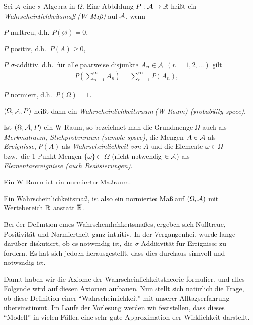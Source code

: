 \begin{defn}
\label{defn:1.7}
Sei $\AA$ eine $\sigma$-Algebra in $\Omega $.  Eine
Abbildung $P: \AA \to \R$ heißt ein \emph{Wahrscheinlichkeitsmaß
(W-Maß)} auf $\AA$, wenn
\begin{defnpropenum}
\item $P$ nulltreu, d.h. $P(\varnothing) = 0$,
\item $P$ positiv, d.h.\ $P(A) \geq 0$,
\item $P$ $\sigma$-additiv, d.h.\ für alle paarweise disjunkte $A_{n} \in
  \AA$\; $(n=1,2, \ldots )$ gilt
\begin{align*}
P\left(\sum^{\infty}_{n=1} A_{n}\right) = \sum^{\infty}_{n=1} P(A_{n}),
\end{align*}
\item $P$ normiert, d.h.\ $P(\Omega)= 1$.
\end{defnpropenum}
$(\Omega, \AA,P)$ heißt dann ein \emph{Wahrscheinlichkeitsraum (W-Raum)
(probability space)}.

Ist $(\Omega, \AA,P)$ ein W-Raum, so bezeichnet man die Grundmenge
$\Omega$ auch als \emph{Merkmalraum, Stichprobenraum (sample space)}, die Mengen
$A\in \AA$ als \emph{Ereignisse}, $P(A)$ als \emph{Wahrscheinlichkeit von $A$}
und die Elemente $\omega \in \Omega$ bzw.\ die 1-Punkt-Mengen $\{\omega \}
\subset \Omega $ (nicht notwendig $\in \AA$) als \emph{Elementarereignisse (auch
Realisierungen)}.

Ein W-Raum ist ein normierter Maßraum.\fishhere
\end{defn}

Ein Wahrscheinlichkeitsmaß, ist also ein normiertes Maß auf $(\Omega,\AA)$ mit
Wertebereich $\R$ anstatt $\RA$.

Bei der Definition eines Wahrscheinlichkeitsmaßes, ergeben sich Nulltreue,
Positivität und Normiertheit ganz intuitiv. In der Vergangenheit wurde lange
darüber diskutiert, ob es notwendig ist, die $\sigma$-Additivität für Ereignisse zu fordern. Es
hat sich jedoch herausgestellt, dass dies durchaus sinnvoll und notwendig ist.

Damit haben wir die Axiome der Wahrscheinlichkeitstheorie formuliert und alles
Folgende wird auf diesen Axiomen aufbauen. Nun stellt sich natürlich die
Frage, ob diese Definition einer ``Wahrscheinlichkeit'' mit unserer
Alltagserfahrung übereinstimmt. Im Laufe der Vorlesung werden wir feststellen,
dass dieses ``Modell'' in vielen Fällen eine sehr gute Approximation der
Wirklichkeit darstellt.

